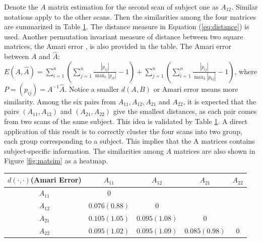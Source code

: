 \documentclass[fleqn,12pt]{article}
\let\oldref\ref
\renewcommand{\ref}[1]{(\oldref{#1})}
\begin{document}
Denote the $A$ matrix estimation for the second scan of subject one as $A_{12}$. Similar notations apply to the other scans. Then the similarities among the four matrices are summarized in Table \oldref{tab:similarity}. The distance measure in Equation \ref{eq:distance} is used. Another permutation invariant measure of distance between two square matrices, the Amari error \citep{amari1996new}, is also provided in the table. The Amari error between $A$ and $\hat{A}$: $E(A,\hat{A}) = \sum\limits_{i=1}^n(\sum\limits_{j=1}^n\frac{|p_{ij}|}{\max_k |p_{ik}|}-1) + \sum\limits_{j=1}^n(\sum\limits_{i=1}^n\frac{|p_{ij}|}{\max_k|p_{kj}|}-1)$, where $P =(p_{ij})=A^{-1}\hat{A}$. Notice a smaller $d(A,B)$ or Amari error means more similarity. Among the six pairs from $A_{11},A_{12},A_{21}$ and $A_{22}$, it is expected that the pairs $(A_{11},A_{12})$ and $(A_{21},A_{22})$ give the smallest distances, as each pair comes from two scans of the same subject. This idea is validated by Table \oldref{tab:similarity}. A direct application of this result is to correctly cluster the four scans into two group, each group corresponding to a subject. This implies that the A matrices contains subject-specific information. The similarities among $A$ matrices are also shown in Figure \oldref{fig:matsim} as a heatmap. %

\begin{table}
\centering
{}
\label{tab:similarity}
\begin{tabular}{c|cccc}
\hline
$d(\cdot,\cdot)$(Amari Error) & $A_{11}$&$A_{12}$ & $A_{21}$&$A_{22}$ \\
\hline
$A_{11}$ & $0$ &  &  &\\
$A_{12}$ & $\mathbf{0.076(0.88)}$& $0$ & &\\
$A_{21}$ & $0.105(1.05)$ & $0.095(1.08)$  & $0$ &\\
$A_{22}$ & $0.095(1.02)$ & $0.095(1.09)$ & $\mathbf{0.085(0.98)}$ & $0$ \\
\hline
\end{tabular}
\end{table}
\end{document}
